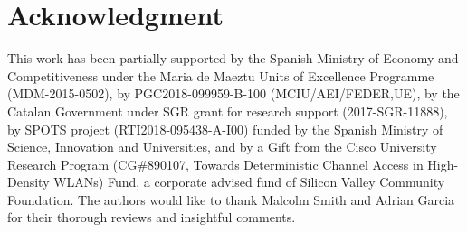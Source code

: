 \documentclass[preprint,12pt]{elsarticle}
\theoremstyle{plain}
\begin{document}
\section*{Acknowledgment}
This  work  has  been  partially  supported  by  the  Spanish Ministry of Economy and Competitiveness under the Maria de Maeztu  Units  of  Excellence  Programme  (MDM-2015-0502), by PGC2018-099959-B-100 (MCIU/AEI/FEDER,UE), by the Catalan Government under SGR grant for research support (2017-SGR-11888), by SPOTS project (RTI2018-095438-A-I00) funded by the Spanish Ministry of Science, Innovation and Universities, and  by a Gift from the Cisco University Research Program (CG\#890107, Towards Deterministic Channel Access in High-Density WLANs) Fund, a corporate advised fund of Silicon Valley Community Foundation.
The authors would like to thank Malcolm Smith and Adrian Garcia for their thorough reviews and insightful comments.
	



\end{document}
